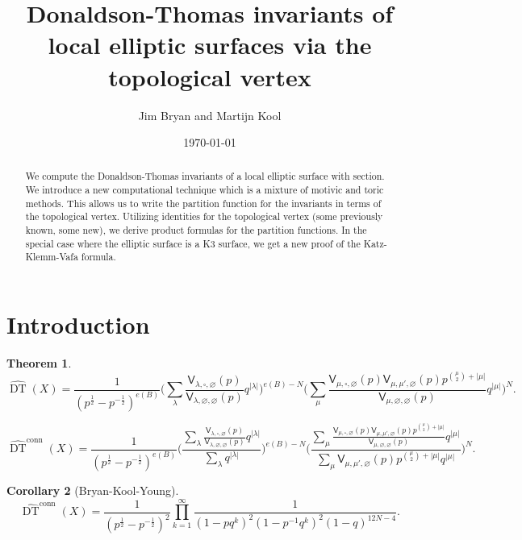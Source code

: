 \documentclass{amsart}
\title{Donaldson-Thomas invariants of local elliptic surfaces via the topological vertex}
\author{Jim Bryan and Martijn Kool}
\date{\today}
\newtheorem{theorem}{Theorem}%
\newtheorem{corollary}[theorem]{Corollary}
\theoremstyle{definition}
\newcommand{\sfV}{\mathsf{V}}
\newcommand{\DT}{\operatorname{DT}}
\newcommand{\conn}{\operatorname{conn}}
\begin{document}
\begin{abstract}

We compute the Donaldson-Thomas invariants of a local elliptic surface
with section. We introduce a new computational technique which is a
mixture of motivic and toric methods. This allows us to write the
partition function for the invariants in terms of the topological
vertex. Utilizing identities for the topological vertex (some
previously known, some new), we derive product formulas for the
partition functions. In the special case where the elliptic surface is
a K3 surface, we get a new proof of the Katz-Klemm-Vafa formula.
\end{abstract}

\maketitle 





\section{Introduction}

\begin{theorem} \label{main}
$$
\widehat{\DT}(X) = \frac{1}{(p^{\frac{1}{2}} - p^{-\frac{1}{2}})^{e(B)}} \Bigg( \sum_{\lambda} \frac{\sfV_{\lambda,\square,\varnothing}(p)}{\sfV_{\lambda,\varnothing,\varnothing}(p)} q^{|\lambda|} \Bigg)^{e(B) - N}  \Bigg( \sum_{\mu} \frac{\sfV_{\mu,\square,\varnothing}(p) \sfV_{\mu,\mu',\varnothing}(p) p^{\binom{\mu}{2} +|\mu|}}{\sfV_{\mu,\varnothing,\varnothing}(p)} q^{|\mu|} \Bigg)^{N}.
$$

$$
\widehat{\DT}^{\conn}(X) = \frac{1}{(p^{\frac{1}{2}} - p^{-\frac{1}{2}})^{e(B)}} \Bigg( \frac{\sum_{\lambda} \frac{\sfV_{\lambda,\square,\varnothing}(p)}{\sfV_{\lambda,\varnothing,\varnothing}(p)} q^{|\lambda|}}{\sum_{\lambda} q^{|\lambda|}} \Bigg)^{e(B) - N}  \Bigg( \frac{\sum_{\mu} \frac{\sfV_{\mu,\square,\varnothing}(p) \sfV_{\mu,\mu',\varnothing}(p) p^{\binom{\mu}{2} +|\mu|}}{\sfV_{\mu,\varnothing,\varnothing}(p)} q^{|\mu|}}{\sum_{\mu} \sfV_{\mu, \mu', \varnothing}(p) p^{\binom{\mu}{2} +|\mu|} q^{|\mu|}} \Bigg)^{N}.
$$

\end{theorem}

\begin{corollary}[Bryan-Kool-Young]
$$
\widehat{\DT}^{\conn}(X) = \frac{1}{(p^{\frac{1}{2}} - p^{-\frac{1}{2}})^{2}} \prod_{k=1}^{\infty} \frac{1}{(1-p q^k)^2 (1-p^{-1} q^k)^2 (1-q)^{12N-4}}.
$$

\end{corollary}
\end{document}
